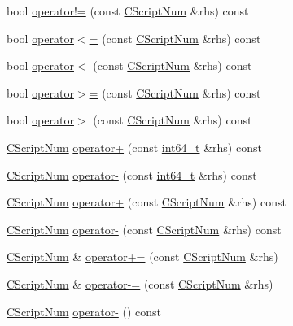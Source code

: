 \begin{DoxyCompactItemize}
\item 
bool \hyperlink{class_c_script_num_aea161271e8d9b2d8fdd48045d38a7725}{operator!=} (const \hyperlink{class_c_script_num}{C\+Script\+Num} \&rhs) const 
\item 
bool \hyperlink{class_c_script_num_a5ed4aa41e828599087d67080aec898a6}{operator$<$=} (const \hyperlink{class_c_script_num}{C\+Script\+Num} \&rhs) const 
\item 
bool \hyperlink{class_c_script_num_a582b21f1dc3583e894fb85ea162c92d6}{operator$<$} (const \hyperlink{class_c_script_num}{C\+Script\+Num} \&rhs) const 
\item 
bool \hyperlink{class_c_script_num_a7f45272bbabd1e0e2b4f899c201f3c15}{operator$>$=} (const \hyperlink{class_c_script_num}{C\+Script\+Num} \&rhs) const 
\item 
bool \hyperlink{class_c_script_num_a68465738661f8f6f216bf3f99849a5c2}{operator$>$} (const \hyperlink{class_c_script_num}{C\+Script\+Num} \&rhs) const 
\item 
\hyperlink{class_c_script_num}{C\+Script\+Num} \hyperlink{class_c_script_num_a6e688183c0e78712327575f81d2388da}{operator+} (const \hyperlink{stdint_8h_adec1df1b8b51cb32b77e5b86fff46471}{int64\+\_\+t} \&rhs) const 
\item 
\hyperlink{class_c_script_num}{C\+Script\+Num} \hyperlink{class_c_script_num_ab9e35a0951d8134c7c50ce2939407a96}{operator-\/} (const \hyperlink{stdint_8h_adec1df1b8b51cb32b77e5b86fff46471}{int64\+\_\+t} \&rhs) const 
\item 
\hyperlink{class_c_script_num}{C\+Script\+Num} \hyperlink{class_c_script_num_a033183dfe2b274bbf598073a053b8eca}{operator+} (const \hyperlink{class_c_script_num}{C\+Script\+Num} \&rhs) const 
\item 
\hyperlink{class_c_script_num}{C\+Script\+Num} \hyperlink{class_c_script_num_a260907928a4c48e18be70abf32a0f270}{operator-\/} (const \hyperlink{class_c_script_num}{C\+Script\+Num} \&rhs) const 
\item 
\hyperlink{class_c_script_num}{C\+Script\+Num} \& \hyperlink{class_c_script_num_a34a41a249893e9561b47aecb98b7fc54}{operator+=} (const \hyperlink{class_c_script_num}{C\+Script\+Num} \&rhs)
\item 
\hyperlink{class_c_script_num}{C\+Script\+Num} \& \hyperlink{class_c_script_num_aac8cae8548fb610e67f444796d89877b}{operator-\/=} (const \hyperlink{class_c_script_num}{C\+Script\+Num} \&rhs)
\item 
\hyperlink{class_c_script_num}{C\+Script\+Num} \hyperlink{class_c_script_num_a13d925ab4d697b8fbcf5bbaa9df9bb40}{operator-\/} () const 

\end{DoxyCompactItemize}
